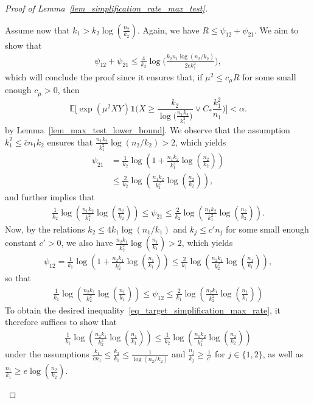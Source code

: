\documentclass{article}
\newcommand{\EE}{\mathbb{E}}
\newcommand{\one}{\mathbf{1}}
\newcommand{\Ct}{C_{*}}
\begin{document}
\begin{proof}[Proof of Lemma~\ref{lem_simplification_rate_max_test}]
\begin{enumerate}
    Assume now that $k_1 > k_2\log\left(\frac{n_2}{k_2}\right)$. 
    Again, we have $R \leq \psi_{12} + \psi_{21}$. 
    We aim to show that
    \begin{align}
        \psi_{12} + \psi_{21} \leq \frac{4}{k_2}\log\big(\frac{k_2n_1\log(n_2/k_2)}{2ek_1^2}\big),\label{eq_target_simplification_max_rate}
    \end{align}
    which will conclude the proof since it ensures that, if $\mu^2 \leq c_\mu R$ for some small enough $c_\mu>0$, then 
    $$\EE\Big[\exp(\mu^2XY)\one\Big(X \geq \frac{k_2}{\log\big(\frac{n_1k_2}{k_1^2}\big)}\lor  \Ct \frac{k_1^2}{n_1}\Big)\Big] < \alpha.$$ 
    by Lemma~\ref{lem_max_test_lower_bound}.
    We observe that the assumption $k_1^2 \leq \bar c n_1 k_2$ ensures that $\frac{n_1k_2}{k_1^2}\log(n_2/k_2) > 2$, which yields
    \begin{align*}
        \psi_{21} &= \frac{1}{k_2} \log\left(1+ \frac{n_1k_2}{k_1^2} \log\left(\frac{n_2}{k_2}\right)\right) \\
        & \leq \frac{2}{k_2} \log\left(\frac{n_1k_2}{k_1^2} \log\left(\frac{n_2}{k_2}\right)\right),
    \end{align*}   
    and further implies that 
    \begin{align}
        \frac{1}{k_2} \log\left(\frac{n_1k_2}{k_1^2} \log\left(\frac{n_2}{k_2}\right)\right) \leq \psi_{21}  \leq \frac{2}{k_2} \log\left(\frac{n_1k_2}{k_1^2} \log\left(\frac{n_2}{k_2}\right)\right).\label{eq_equiv_psi21}
    \end{align}
    Now, by the relations $k_2 \leq 4 k_1\log(n_1/k_1)$ and $k_j \leq c' n_j$ for some small enough constant $c'>0$, we also have $\frac{n_2k_1}{k_2^2} \log\left(\frac{n_1}{k_1}\right)>2$, which yields
    \begin{align*}
        \psi_{12} = \frac{1}{k_1} \log\left(1+ \frac{n_2k_1}{k_2^2} \log\left(\frac{n_1}{k_1}\right)\right) \leq \frac{2}{k_1} \log\left( \frac{n_2k_1}{k_2^2} \log\left(\frac{n_1}{k_1}\right)\right),
    \end{align*}
    so that
    \begin{align}
        \frac{1}{k_1} \log\left( \frac{n_2k_1}{k_2^2} \log\left(\frac{n_1}{k_1}\right)\right) \leq \psi_{12} \leq \frac{2}{k_1} \log\left( \frac{n_2k_1}{k_2^2} \log\left(\frac{n_1}{k_1}\right)\right) \label{eq_equiv_psi12}
    \end{align}
    To obtain the desired inequality~\eqref{eq_target_simplification_max_rate}, it therefore suffices to show that 
    \begin{align}
        \frac{1}{k_1} \log\left( \frac{n_2k_1}{k_2^2} \log\left(\frac{n_1}{k_1}\right)\right) \leq \frac{1}{k_2} \log\left( \frac{n_1k_2}{k_1^2} \log\left(\frac{n_2}{k_2}\right)\right)\label{eq_new_target}
    \end{align}
    under the assumptions $\frac{k_1}{\bar c n_1} \leq \frac{k_2}{k_1} \leq \frac{1}{\log(n_2/k_2)}$ and $\frac{n_j}{k_j} \geq \frac{1}{c'}$ for $j\in\{1,2\}$, as well as $\frac{n_1}{k_1} \geq e \log\left(\frac{n_2}{k_2}\right)$. 
    

\end{enumerate}
\end{proof}
\end{document}
